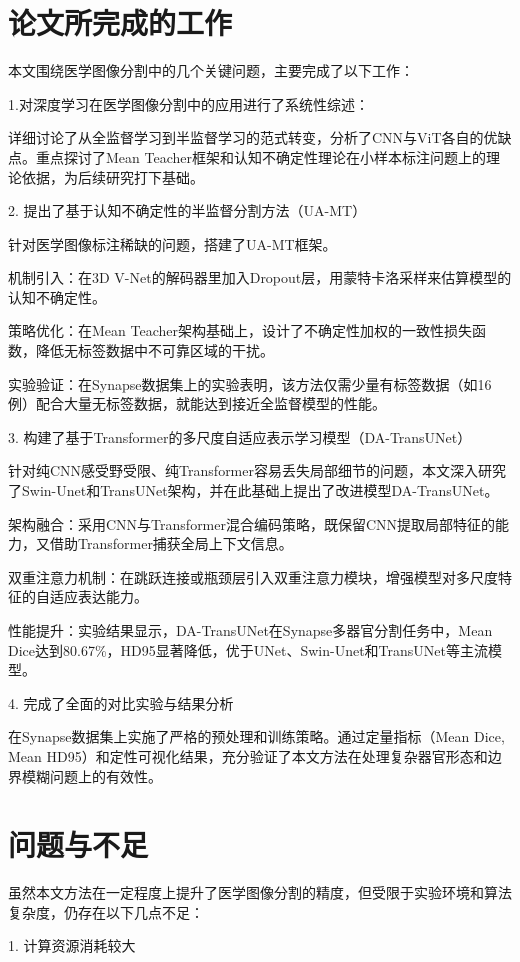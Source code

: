 \documentclass{xduugthesis}
\begin{document}
\section{论文所完成的工作}
本文围绕医学图像分割中的几个关键问题，主要完成了以下工作：

1.对深度学习在医学图像分割中的应用进行了系统性综述：

详细讨论了从全监督学习到半监督学习的范式转变，分析了CNN与ViT各自的优缺点。重点探讨了Mean Teacher框架和认知不确定性理论在小样本标注问题上的理论依据，为后续研究打下基础。

2. 提出了基于认知不确定性的半监督分割方法（UA-MT）

针对医学图像标注稀缺的问题，搭建了UA-MT框架。

机制引入：在3D V-Net的解码器里加入Dropout层，用蒙特卡洛采样来估算模型的认知不确定性。

策略优化：在Mean Teacher架构基础上，设计了不确定性加权的一致性损失函数，降低无标签数据中不可靠区域的干扰。

实验验证：在Synapse数据集上的实验表明，该方法仅需少量有标签数据（如16例）配合大量无标签数据，就能达到接近全监督模型的性能。

3. 构建了基于Transformer的多尺度自适应表示学习模型（DA-TransUNet）

针对纯CNN感受野受限、纯Transformer容易丢失局部细节的问题，本文深入研究了Swin-Unet和TransUNet架构，并在此基础上提出了改进模型DA-TransUNet。

架构融合：采用CNN与Transformer混合编码策略，既保留CNN提取局部特征的能力，又借助Transformer捕获全局上下文信息。

双重注意力机制：在跳跃连接或瓶颈层引入双重注意力模块，增强模型对多尺度特征的自适应表达能力。

性能提升：实验结果显示，DA-TransUNet在Synapse多器官分割任务中，Mean Dice达到80.67\%，HD95显著降低，优于UNet、Swin-Unet和TransUNet等主流模型。

4. 完成了全面的对比实验与结果分析

在Synapse数据集上实施了严格的预处理和训练策略。通过定量指标（Mean Dice, Mean HD95）和定性可视化结果，充分验证了本文方法在处理复杂器官形态和边界模糊问题上的有效性。

\section{问题与不足}
虽然本文方法在一定程度上提升了医学图像分割的精度，但受限于实验环境和算法复杂度，仍存在以下几点不足：

1. 计算资源消耗较大
\end{document}
